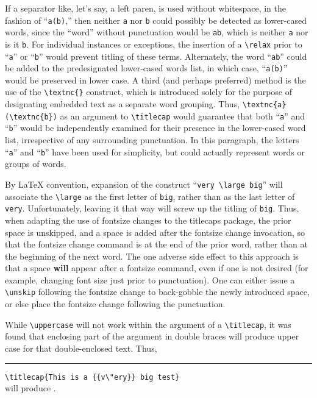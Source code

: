 \documentclass{article}
\newcommand\rl{\rule{1em}{0in}}
\def\tcp{\textsf{titlecaps}}
\let\vb\verb
\newcommand\margtt[1]{\marginpar{\hfill\ttfamily#1}}
\begin{document}
{If a separator like, let's say, a left paren, is used without
whitespace, in the fashion of ``\verb|a(b)|,'' then neither \verb|a| nor
\verb|b| could possibly be detected as lower-cased words, since
the ``word'' without punctuation would be \verb|ab|, which is neither
\verb|a| nor is it \verb|b|.  For individual instances or exceptions,
the insertion of a \verb|\relax| prior to ``\verb|a|'' or ``\verb|b|''
would prevent titling of these terms.  Alternately, the word
``\verb|ab|'' could be added to the predesignated lower-cased words
list, in which case, ``\verb|a(b)|'' would be preserved in lower case.
A third (and perhaps preferred) method is the use of the
\verb|\textnc{}| construct, which is introduced solely for the purpose
of designating embedded text as a separate word grouping.  Thus,
\verb|\textnc{a}(\textnc{b})| as an argument to \verb|\titlecap| would
guarantee that both ``\verb|a|'' and ``\verb|b|'' would be independently
examined for their presence in the lower-cased word list, irrespective
of any surrounding punctuation.  In this paragraph, the letters
``\verb|a|'' and ``\verb|b|'' have been used for simplicity, but could
actually represent words or groups of words.

By \LaTeX{} convention, expansion of the construct 
``\vb|very \large big|'' will 
associate the \vb|\large| as the first letter of \vb|big|, rather than
as the last letter of \vb|very|.  Unfortunately, leaving it that way
will screw up the titling of \vb|big|.  Thus, when adapting the use of
fontsize changes to the {\tcp} package, the prior space is unskipped,
and a space is added after the fontsize change invocation, so that the
fontsize change command is at the end of the prior word, rather than at
the beginning of the next word.  The one adverse side effect to this
approach is that a space \textbf{will} appear after a fontsize command,
even if one is not desired (for example, changing font size just prior
to punctuation).  One can either issue a \vb|\unskip| following the
fontsize change to back-gobble the newly introduced space, or else place
the fontsize change following the punctuation.

While \vb|\uppercase| will not work within the argument of a
\vb|\titlecap|, it was found that enclosing part of the argument in
double braces \margtt{\char'173\char'173~\char'175\char'175}will produce
upper case for that double-enclosed text.  Thus,\\
\rl\vb|\titlecap{This is a {{v\"ery}} big test}|\\
will produce .

}
\end{document}
